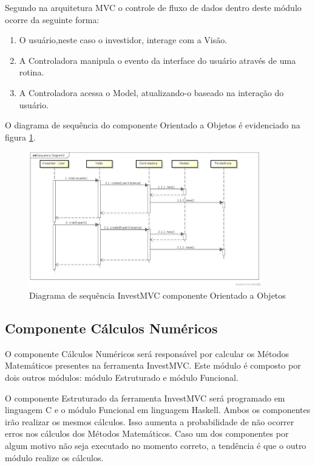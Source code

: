 Segundo  na arquitetura MVC o controle de fluxo de dados dentro deste módulo ocorre da seguinte forma:

\begin{enumerate}
\item O usuário,neste caso o investidor, interage com a Visão.
\item A Controladora manipula o evento da interface do usuário através de uma rotina.
\item A Controladora acessa o Model, atualizando-o baseado na interação do usuário.
\end{enumerate}

O diagrama de sequência do componente Orientado a Objetos é evidenciado na figura \ref{sequenciaOO}.

\begin{figure}[H]
\centering
\includegraphics[width=0.9\textwidth]{figuras/sequenciaOO}
\caption{Diagrama de sequência InvestMVC componente Orientado a Objetos}
\label{sequenciaOO}
\end{figure}

\subsection{Componente Cálculos Numéricos}

O componente Cálculos Numéricos será responsável por calcular os Métodos Matemáticos presentes na ferramenta InvestMVC. Este módulo é composto por dois outros módulos: módulo Estruturado e módulo Funcional.

O componente Estruturado da ferramenta InvestMVC será programado em linguagem C e o módulo Funcional em linguagem Haskell. Ambos os componentes irão realizar os mesmos cálculos. Isso aumenta a probabilidade de não ocorrer erros nos cálculos dos Métodos Matemáticos. Caso um dos componentes por algum motivo não seja executado no momento correto, a tendência é que o outro módulo realize os cálculos.

